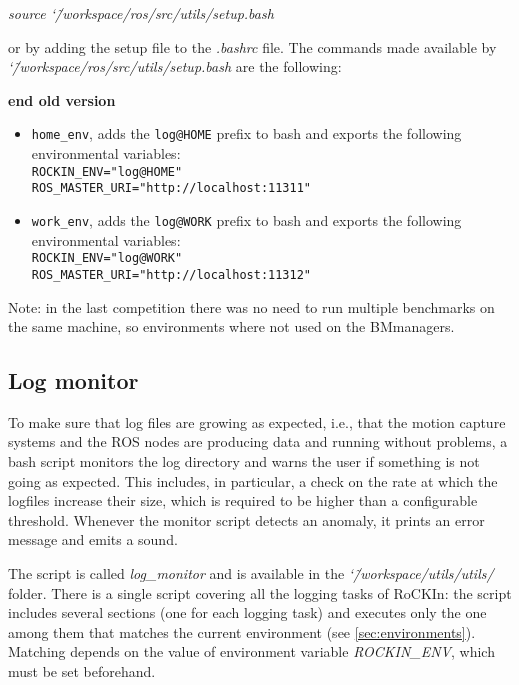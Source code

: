 \documentclass[a4paper]{article}
\newcommand{\ro}{RoCKIn}
\newcommand{\srcdir}{\char`\~/workspace/ros/src/}
\newcommand{\toolsdir}{\char`\~/workspace/utils/}
\begin{document}
\emph{source \srcdir utils/setup.bash}
 
or by adding the setup file to the \emph{.bashrc} file. The commands made available by \emph{\srcdir utils/setup.bash} are the following:

\textbf{ end old version }



\begin{itemize}
  \item \verb|home_env|, adds the \verb|log@HOME| prefix to bash and exports the following environmental variables:\\
    \verb|ROCKIN_ENV="log@HOME"|\\
    \verb|ROS_MASTER_URI="http://localhost:11311"|

  \item \verb|work_env|, adds the \verb|log@WORK| prefix to bash and exports the following environmental variables:\\
    \verb|ROCKIN_ENV="log@WORK"|\\
    \verb|ROS_MASTER_URI="http://localhost:11312"|
\end{itemize}

Note: in the last competition there was no need to run multiple benchmarks on the same machine, so environments where not used on the BMmanagers.


\subsection{Log monitor}
\label{logmonitor}

To make sure that log files are growing as expected, i.e., that the motion capture systems and the ROS nodes are producing data and running without problems, a bash script monitors the log directory and warns the user if something is not going as expected. This includes, in particular, a check on the rate at which the logfiles increase their size, which is required to be higher than a configurable threshold. Whenever the monitor script detects an anomaly, it prints an error message and emits a sound.

The script is called \emph{log\_monitor} and is available in the \emph{\toolsdir utils/} folder. There is a single script covering all the logging tasks of \ro: the script includes several sections (one for each logging task) and executes only the one among them that matches the current environment (see \ref{sec:environments}). Matching depends on the value of environment variable \textit{ROCKIN\_ENV}, which must be set beforehand.
\end{document}
